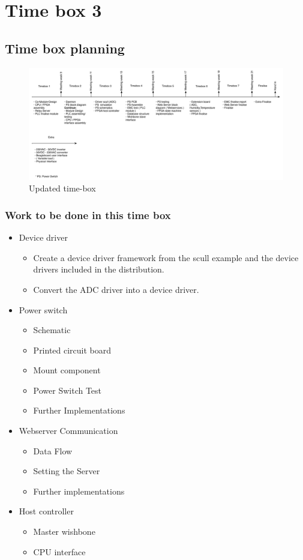 \section{Time box 3}
\subsection{Time box planning}

\begin{figure}[H]
	\begin{centering}
		 \includegraphics[width=1.0\textwidth]{images/tb_r3.pdf}
		\caption{Updated time-box}
	\end{centering}
\end{figure}

\subsubsection{Work to be done in this time box}
\begin{itemize}
	\item Device driver
	\begin{itemize}
		\item Create a device driver framework from the scull example and the device drivers included in the distribution. 
		\item Convert the ADC driver into a device driver.
	\end{itemize}
	\item Power switch
	\begin{itemize}
		\item Schematic
		\item Printed circuit board
		\item Mount component
		\item Power Switch Test
		\item Further Implementations
	\end{itemize}
	\item{Webserver Communication}
	\begin{itemize}
		\item Data Flow
		\item Setting the Server
		\item Further implementations
	\end{itemize}
	\item Host controller
	\begin{itemize}
		\item Master wishbone
		\item CPU interface
	\end{itemize}
\end{itemize}
